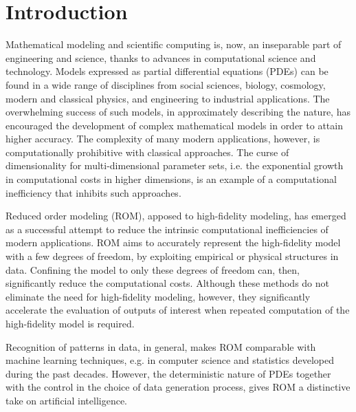 \chapter*{Introduction}
Mathematical modeling and scientific computing is, now, an inseparable part of engineering and science, thanks to advances in computational science and technology. Models expressed as partial differential equations (PDEs) can be found in a wide range of disciplines from social sciences, biology, cosmology, modern and classical physics, and engineering to industrial applications. The overwhelming success of such models, in approximately describing the nature, has encouraged the development of complex mathematical models in order to attain higher accuracy. The complexity of many modern applications, however, is computationally prohibitive with classical approaches. The curse of dimensionality for multi-dimensional parameter sets, i.e. the exponential growth in computational costs in higher dimensions, is an example of a computational inefficiency that inhibits such approaches.

Reduced order modeling (ROM), apposed to high-fidelity modeling, has emerged as a successful attempt to reduce the intrinsic computational inefficiencies of modern applications. ROM aims to accurately represent the high-fidelity model with a few degrees of freedom, by exploiting empirical or physical structures in data. Confining the model to only these degrees of freedom can, then, significantly reduce the computational costs. Although these methods do not eliminate the need for high-fidelity modeling, however, they significantly accelerate the evaluation of outputs of interest when repeated computation of the high-fidelity model is required.


Recognition of patterns in data, in general, makes ROM comparable with machine learning techniques, e.g. in computer science and statistics developed during the past decades. However, the deterministic nature of PDEs together with the control in the choice of data generation process, gives ROM a distinctive take on artificial intelligence. 

